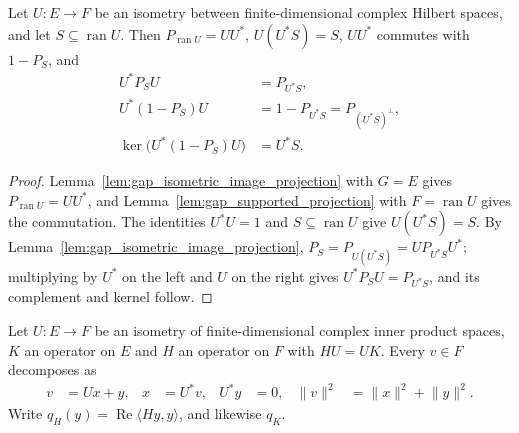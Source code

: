 \begin{theorem}
    \label{thm:gap_supported_compression}
    \leanok
    Let $U:E\to F$ be an isometry between finite-dimensional complex Hilbert spaces,
    and let $S\subseteq\operatorname{ran}U$. Then $P_{\operatorname{ran}U}=UU^*$,
    $U(U^*S)=S$, $UU^*$ commutes with $1-P_S$, and
    \begin{align*}
        U^*P_SU                     & =P_{U^*S},                    \\
        U^*(1-P_S)U                 & =1-P_{U^*S}=P_{(U^*S)^\perp}, \\
        \ker\bigl(U^*(1-P_S)U\bigr) & =U^*S.
    \end{align*}
\end{theorem}
\begin{proof}\leanok
    Lemma~\ref{lem:gap_isometric_image_projection} with $G=E$ gives
    $P_{\operatorname{ran}U}=UU^*$, and Lemma~\ref{lem:gap_supported_projection} with
    $F=\operatorname{ran}U$ gives the commutation. The identities $U^*U=1$ and
    $S\subseteq\operatorname{ran}U$ give $U(U^*S)=S$. By
    Lemma~\ref{lem:gap_isometric_image_projection}, $P_S=P_{U(U^*S)}=UP_{U^*S}U^*$;
    multiplying by $U^*$ on the left and $U$ on the right gives $U^*P_SU=P_{U^*S}$,
    and its complement and kernel follow.
\end{proof}

Let $U:E\to F$ be an isometry of finite-dimensional complex inner product spaces, $K$ an
operator on $E$ and $H$ an operator on $F$ with $HU=UK$. Every $v\in F$ decomposes as
\begin{align}
    v & =Ux+y, & x & =U^*v, & U^*y & =0, & \lVert v\rVert^2 & =\lVert x\rVert^2+\lVert y\rVert^2.
    \label{eq:gap_inclusion_split}
\end{align}
Write $q_H(y)=\operatorname{Re}\langle Hy,y\rangle$, and likewise $q_K$.

